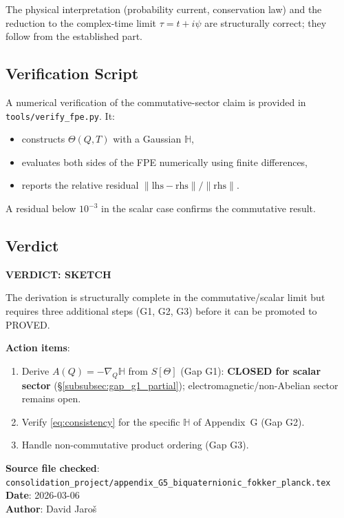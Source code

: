 \documentclass[12pt]{article}
\theoremstyle{definition}
\theoremstyle{remark}
\begin{document}
The physical interpretation (probability current, conservation law) and the reduction
to the complex-time limit $\tau = t+i\psi$ are structurally correct; they follow from
the established part.

\subsection{Verification Script}

A numerical verification of the commutative-sector claim is provided in
\texttt{tools/verify\_fpe.py}.  It:
\begin{itemize}
  \item constructs $\Theta(Q,T)$ with a Gaussian $\mathbb{H}$,
  \item evaluates both sides of the FPE numerically using finite differences,
  \item reports the relative residual $\|\text{lhs} - \text{rhs}\|/\|\text{rhs}\|$.
\end{itemize}

A residual below $10^{-3}$ in the scalar case confirms the commutative result.

\subsection{Verdict}

\begin{center}
\large\textbf{VERDICT: SKETCH}
\end{center}

The derivation is structurally complete in the commutative/scalar limit but requires
three additional steps (G1, G2, G3) before it can be promoted to PROVED.

\textbf{Action items}:
\begin{enumerate}
  \item Derive $A(Q) = -\nabla_Q\mathbb{H}$ from $S[\Theta]$ (Gap G1):
        \textbf{CLOSED for scalar sector} (§\ref{subsubsec:gap_g1_partial});
        electromagnetic/non-Abelian sector remains open.
  \item Verify \eqref{eq:consistency} for the specific $\mathbb{H}$ of Appendix~G (Gap G2).
  \item Handle non-commutative product ordering (Gap G3).
\end{enumerate}

\noindent\textbf{Source file checked}: \texttt{consolidation\_project/appendix\_G5\_biquaternionic\_fokker\_planck.tex}\\
\textbf{Date}: 2026-03-06\\
\textbf{Author}: David Jaroš

\ifdefined\INCLUDEMODE
\else
\end{document}
